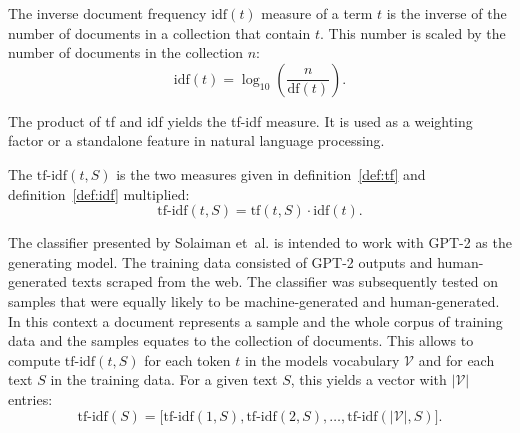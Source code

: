     \begin{definition}
    \label{def:idf}
        The inverse document frequency $\mathrm{idf}(t)$ measure of a term $t$ is the inverse of the number of documents in a collection that contain $t$. 
        This number is scaled by the number of documents in the collection $n$:
        \begin{equation}
            \mathrm{idf}(t)= \log_{10} \left( \frac{n}{\mathrm{df}(t)} \right)\text{.}
        \end{equation}
    \end{definition}

    The product of tf and idf yields the tf-idf measure.
    It is used as a weighting factor or a standalone feature in natural language processing.

    \begin{definition}
        The $\text{tf-idf}(t,S)$ is the two measures given in definition~\ref{def:tf} and definition~\ref{def:idf} multiplied:
        \begin{equation}
            \text{tf-idf}(t,S) = \mathrm{tf}(t,S) \cdot \mathrm{idf}(t) \text{.}
        \end{equation}
    \end{definition}

    The classifier presented by Solaiman et~al. \cite{solaiman2019release} is intended to work with GPT-2 \cite{radford2019language} as the generating model.
    The training data consisted of GPT-2 outputs and human-generated texts scraped from the web.
    The classifier was subsequently tested on samples that were equally likely to be machine-generated and human-generated.
    In this context a document represents a sample and the whole corpus of training data and the samples equates to the collection of documents.
    This allows to compute $\text{tf-idf}(t,S)$ for each token $t$ in the models vocabulary $\mathcal{V}$ and for each text $S$ in the training data.
    For a given text $S$, this yields a vector with $|\mathcal{V}|$ entries:
    \begin{equation}
        \label{eq:tf-idf}
        \text{tf-idf}(S) = \big[ \text{tf-idf}(1,S), \text{tf-idf}(2,S), \dots, \text{tf-idf}(|\mathcal{V}|,S) \big] \text{.}
    \end{equation}
    
